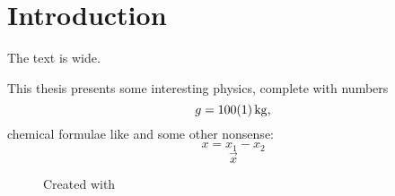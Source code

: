 \chapter{Introduction}\label{ch:introduction}
The text is \the\textwidth {} wide.

This thesis presents some interesting physics, complete with numbers
\begin{equation}
   g = \SI{100+-1}{kg}\text{,}
\end{equation}
chemical formulae like  and some other nonsense:
\begin{equation}
   x = x_1 - x_2
\end{equation}
\begin{equation}
\vec{x}
\end{equation}

\begin{figure}[!ht]
	\centering
		
	\caption{Created with }
\end{figure}

